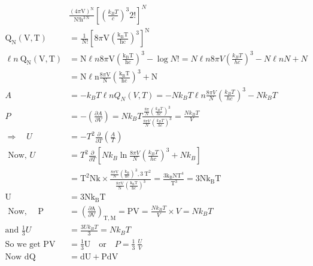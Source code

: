 \begin{enumerate}
\begin{answer}
\begin{align*}
		&\frac{(4 \pi \mathrm{V})^{\mathrm{N}}}{\mathrm{N} ! \mathrm{h}^{3 \mathrm{~N}}}\left[ \left( \frac{k_B T}{c}\right)^3 2!\right] ^N\\
		\mathrm{Q}_{\mathrm{N}}(\mathrm{V}, \mathrm{T})&=\frac{1}{\mathrm{~N} !}\left[8 \pi \mathrm{V}\left(\frac{\mathrm{k}_{\mathrm{B}} \mathrm{T}}{\mathrm{hc}}\right)^{3}\right]^{\mathrm{N}}\\
		\ell n \ \mathrm{Q}_{\mathrm{N}}(\mathrm{V}, \mathrm{T})&=\mathrm{N} \ell n 8 \pi \mathrm{V}\left(\frac{\mathrm{k}_{\mathrm{B}} \mathrm{T}}{\mathrm{hc}}\right)^{3}-\log N !=N \ell n 8 \pi V\left(\frac{k_{B} T}{h c}\right)^{3}-N \ell n N+N\\
		&=\mathrm{N} \ell \mathrm{n} \frac{8 \pi \mathrm{V}}{\mathrm{N}}\left(\frac{\mathrm{k}_{\mathrm{B}} \mathrm{T}}{\mathrm{hc}}\right)^{3}+\mathrm{N}\\
		A&=-k_{B} T \ell n Q_{N}(V, T)=-N k_{B} T \ell n \frac{8 \pi V}{N}\left(\frac{k_{B} T}{h c}\right)^{3}-N k_{B} T\\
		P&=-\left(\frac{\partial A}{\partial V}\right)=N k_{B} T \frac{\frac{8 \pi}{N}\left(\frac{k_{B} T}{h c}\right)^{3}}{\frac{8 \pi V}{N}\left(\frac{k_{B} T}{h c}\right)^{3}}=\frac{N k_{B} T}{V}\\
		\Rightarrow \quad U&=-T^{2} \frac{\partial}{\partial T}\left(\frac{A}{T}\right)\\
	\text{	Now, }U&=T^{2} \frac{\partial}{\partial T}\left[N k_{B} \ln \frac{8 \pi V}{N}\left(\frac{k_{B} T}{h c}\right)^{3}+N k_{B}\right]\\
	&=\mathrm{T}^{2} \mathrm{Nk} \times \frac{\frac{8 \pi \mathrm{V}}{\mathrm{N}}\left(\frac{\mathrm{k}_{\mathrm{B}}}{\mathrm{hc}}\right)^{3}, 3 \mathrm{~T}^{2}}{\frac{8 \pi \mathrm{V}}{\mathrm{N}}\left(\frac{\mathrm{k}_{\mathrm{B}} \mathrm{T}}{\mathrm{hc}}\right)^{3}}=\frac{3 \mathrm{k}_{\mathrm{B}} \mathrm{NT}^{4}}{\mathrm{~T}^{3}}=3 \mathrm{Nk}_{\mathrm{B}} \mathrm{T}\\
	\mathrm{U}&=3 \mathrm{Nk}_{\mathrm{B}} \mathrm{T}\\
\text{	Now, }\quad \mathrm{P}&=\left(\frac{\partial \mathrm{A}}{\partial \mathrm{V}}\right)_{\mathrm{T}, \mathrm{M}}=\mathrm{PV}=\frac{Nk_B T}{V}\times V=N k_B T\\
\text{and }\frac{1}{3} U&=\frac{3 U k_{B} T}{3}=N k_{B} T\\
\text{So we get }\mathrm{PV}&=\frac{1}{3} \mathrm{U} \quad \text{or}\quad P=\frac{1}{3}\ \frac{U}{V}\\
\text{Now }\mathrm{dQ}&=\mathrm{dU}+\mathrm{PdV}\\

\end{align*}
\end{answer}
\end{enumerate}
